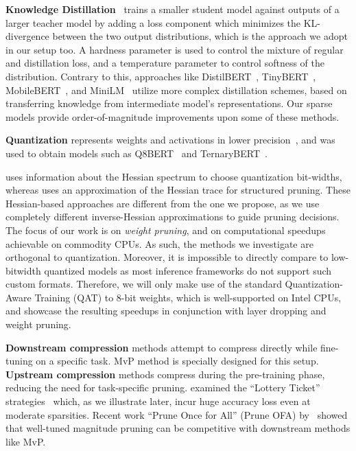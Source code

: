 \documentclass[11pt]{article}
\begin{document}
\noindent\textbf{Knowledge Distillation}~\cite{Hinton2015DistillingTK} trains a smaller student model against outputs of a larger teacher model by adding a loss component which minimizes the KL-divergence between the two output distributions, which is the approach we adopt in our setup too. A hardness parameter is used to control the mixture of regular and distillation loss, and a temperature parameter to control softness of the distribution. Contrary to this, approaches like DistilBERT~\cite{Sanh2019DistilBERTAD}, TinyBERT~\cite{Jiao2020TinyBERTDB}, MobileBERT~\cite{Sun2020MobileBERTAC}, and MiniLM~\cite{Wang2020MiniLMDS} utilize more complex distillation schemes, based on transferring knowledge from intermediate model's representations. Our sparse models provide order-of-magnitude improvements upon some of these methods. 

\noindent\textbf{Quantization} represents weights and activations in lower precision~\cite{Courbariaux2016BinarizedNN}, and was used to obtain models such as Q8BERT~\cite{Zafrir2019Q8BERTQ8} and TernaryBERT~\cite{zhang2020ternarybert}.

\citet{shen2020q} uses information about the Hessian spectrum to choose quantization bit-widths, whereas \citet{yu2022hessian} uses an approximation of the Hessian trace for structured pruning.
These Hessian-based approaches are different from the one we propose, as we use completely different inverse-Hessian approximations to guide pruning decisions. 
The focus of our work is on \emph{weight pruning}, and on computational speedups achievable on commodity CPUs. 
As such, the methods we investigate are orthogonal to quantization. 
Moreover, it is impossible to directly compare to low-bitwidth quantized models as most inference frameworks do not support such custom formats. Therefore, we will only make use of the standard Quantization-Aware Training (QAT) to 8-bit weights, which is well-supported on Intel CPUs, and showcase the resulting speedups in conjunction with layer dropping and weight pruning. 

\noindent\textbf{Downstream compression} methods attempt to compress directly while fine-tuning on a specific task. MvP method is specially designed for this setup. \textbf{Upstream compression} methods compress during the pre-training phase, reducing the need for task-specific pruning. \citet{Chen2020TheLT} examined the ``Lottery Ticket'' strategies~\cite{Frankle2019TheLT} which, as we illustrate later, incur huge accuracy loss even at moderate sparsities. Recent work ``Prune Once for All'' (Prune OFA) by~\citet{zafrir2021prune} showed that well-tuned magnitude pruning can be competitive with downstream methods like MvP.
\end{document}
